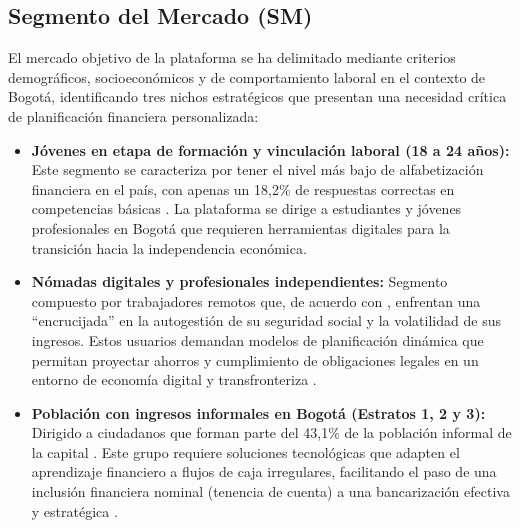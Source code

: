 {}
\subsection*{Segmento del Mercado (SM)}


El mercado objetivo de la plataforma se ha delimitado mediante criterios demográficos, socioeconómicos y de comportamiento laboral en el contexto de Bogotá, identificando tres nichos estratégicos que presentan una necesidad crítica de planificación financiera personalizada:

\begin{itemize}
	\item \textbf{Jóvenes en etapa de formación y vinculación laboral (18 a 24 años):} Este segmento se caracteriza por tener el nivel más bajo de alfabetización financiera en el país, con apenas un 18,2\% de respuestas correctas en competencias básicas \parencite[p. 5]{Departamento01}. La plataforma se dirige a estudiantes y jóvenes profesionales en Bogotá que requieren herramientas digitales para la transición hacia la independencia económica.
	
	\item \textbf{Nómadas digitales y profesionales independientes:} Segmento compuesto por trabajadores remotos que, de acuerdo con \textcite{Rodriguez2025}, enfrentan una ``encrucijada'' en la autogestión de su seguridad social y la volatilidad de sus ingresos. Estos usuarios demandan modelos de planificación dinámica que permitan proyectar ahorros y cumplimiento de obligaciones legales en un entorno de economía digital y transfronteriza \parencite{RevistaCIES01}.
	
	\item \textbf{Población con ingresos informales en Bogotá (Estratos 1, 2 y 3):} Dirigido a ciudadanos que forman parte del 43,1\% de la población informal de la capital \parencite[p. 1]{DANE01}. Este grupo requiere soluciones tecnológicas que adapten el aprendizaje financiero a flujos de caja irregulares, facilitando el paso de una inclusión financiera nominal (tenencia de cuenta) a una bancarización efectiva y estratégica \parencite[p. 7]{Departamento01}.
\end{itemize}